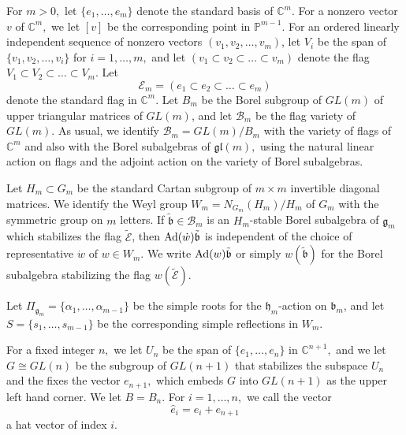 \documentclass[12pt]{amsart}
\numberwithin{equation}{section}
\newcommand{\fg}{\mbox{${\mathfrak g}$}}
\newcommand{\fl}{\mbox{${\mathfrak l}$}}
\newcommand{\fh}{\mbox{${\mathfrak h}$}}
\newcommand{\fb}{\mbox{${\mathfrak b}$}}
\newcommand{\C}{\mbox{${\mathbb C}$}}
\newcommand{\Ad}{{\rm Ad}}
\newcommand{\B}{\mathcal{B}}
\begin{document}
 For $m > 0,$  let $\{e_{1},\dots, e_{m}\}$ denote the standard basis of $\C^{m}$. For a nonzero vector $v$ of $\C^m,$ we let $[v]$ be the corresponding point in $\mathbb{P}^{m-1}.$   For an ordered linearly independent sequence of nonzero vectors $(v_1, v_2, \dots, v_m)$, let $V_i$ be the span of $\{ v_1, v_2, \dots, v_i \}$ for $i=1, \dots, m,$
and let $(v_1 \subset v_2 \subset \dots \subset v_m)$ denote the flag $V_1 \subset V_2 \subset \dots \subset V_m.$  Let 
\[
\mathcal{E}_m = (e_1 \subset e_2 \subset \dots \subset e_m)
\] 
denote the standard flag in $\C^m.$   Let $B_m$ be the Borel subgroup of $GL(m)$ of upper triangular matrices of $GL(m)$, and let $\B_{m}$ be the flag variety of $GL(m)$.  As usual, we identify $\B_{m}=GL(m)/B_m$ with the variety of flags of $\C^m$ and also with the Borel subalgebras of $\fg\fl(m),$ using the natural linear action on flags and the adjoint action on the variety of Borel subalgebras.

 Let $H_{m}\subset G_{m}$ be the standard Cartan subgroup of $m\times m$ invertible diagonal matrices.  We identify the Weyl group $W_m=N_{G_{m}}(H_{m})/H_{m}$ of $G_{m}$ with the symmetric group on $m$ letters.  If $\tilde{\fb}\in \B_{m}$ is an $H_{m}$-stable Borel subalgebra of $\fg_{m}$ which stabilizes the flag $\tilde{\mathcal{E}}$, then $\Ad(\dot{w}) \tilde{\fb}$ is independent of the choice of representative $\dot{w}$ of $w\in W_{m}$.  We write $\Ad(w)\tilde{\fb}$ or simply $w(\tilde{\fb})$ for the Borel subalgebra stabilizing the flag $w(\tilde{\mathcal{E}})$.

 Let $\Pi_{\fg_{m}}=\{ \alpha_1, \dots, \alpha_{m-1} \}$ be the simple roots for the $\fh_{m}$-action on $\fb_{m}$, and let $S=\{ s_{1}, \dots, s_{m-1} \}$ be the corresponding simple reflections in $W_{m}.$


For a fixed integer $n,$ we let $U_n$ be the span of $\{ e_1, \dots, e_n \}$ in $\C^{n+1},$ and we let $G\cong GL(n)$ be the subgroup of $GL(n+1)$ that stabilizes the subspace $U_n$ and the fixes the vector $e_{n+1},$ which embeds $G$ into $GL(n+1)$ as the upper left hand corner.  We let $B=B_{n}.$ 
   For $i=1, \dots, n,$ we call the vector
\begin{equation}\label{e:hatvectordef}
\hat{e}_{i}=e_i + e_{n+1}
\end{equation}
a hat vector of index $i.$
\end{document}
